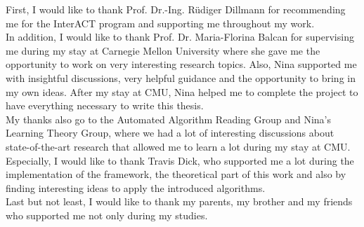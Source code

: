 \acks

First, I would like to thank Prof. Dr.-Ing. R\"{u}diger Dillmann for recommending me for the InterACT program and supporting me throughout my work.\\

In addition, I would like to thank Prof. Dr. Maria-Florina Balcan for supervising me during my stay at Carnegie Mellon University where she gave me the opportunity to work on very interesting research topics. Also, Nina supported me with insightful discussions, very helpful guidance and the opportunity to bring in my own ideas. After my stay at CMU, Nina helped me to complete the project to have everything necessary to write this thesis.\\

My thanks also go to the Automated Algorithm Reading Group and Nina's Learning Theory Group, where we had a lot of interesting discussions about state-of-the-art research that allowed me to learn a lot during my stay at CMU. Especially, I would like to thank Travis Dick, who supported me a lot during the implementation of the framework, the theoretical part of this work and also by finding interesting ideas to apply the introduced algorithms.\\

Last but not least, I would like to thank my parents, my brother and my friends who supported me not only during my studies.